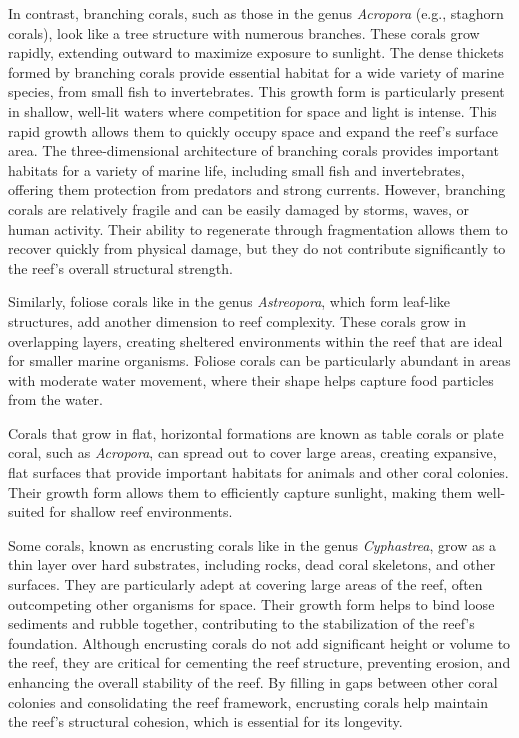 In contrast, branching corals, such as those in the genus \textit{Acropora} (e.g., staghorn corals), look like a tree structure with numerous branches. These corals grow rapidly, extending outward to maximize exposure to sunlight. The dense thickets formed by branching corals provide essential habitat for a wide variety of marine species, from small fish to invertebrates. This growth form is particularly present in shallow, well-lit waters where competition for space and light is intense. This rapid growth allows them to quickly occupy space and expand the reef's surface area. The three-dimensional architecture of branching corals provides important habitats for a variety of marine life, including small fish and invertebrates, offering them protection from predators and strong currents. However, branching corals are relatively fragile and can be easily damaged by storms, waves, or human activity. Their ability to regenerate through fragmentation allows them to recover quickly from physical damage, but they do not contribute significantly to the reef's overall structural strength.

Similarly, foliose corals like in the genus \textit{Astreopora}, which form leaf-like structures, add another dimension to reef complexity. These corals grow in overlapping layers, creating sheltered environments within the reef that are ideal for smaller marine organisms. Foliose corals can be particularly abundant in areas with moderate water movement, where their shape helps capture food particles from the water.

Corals that grow in flat, horizontal formations are known as table corals or plate coral, such as \textit{Acropora}, can spread out to cover large areas, creating expansive, flat surfaces that provide important habitats for animals and other coral colonies. Their growth form allows them to efficiently capture sunlight, making them well-suited for shallow reef environments.

Some corals, known as encrusting corals like in the genus \textit{Cyphastrea}, grow as a thin layer over hard substrates, including rocks, dead coral skeletons, and other surfaces. They are particularly adept at covering large areas of the reef, often outcompeting other organisms for space. Their growth form helps to bind loose sediments and rubble together, contributing to the stabilization of the reef's foundation. Although encrusting corals do not add significant height or volume to the reef, they are critical for cementing the reef structure, preventing erosion, and enhancing the overall stability of the reef. By filling in gaps between other coral colonies and consolidating the reef framework, encrusting corals help maintain the reef's structural cohesion, which is essential for its longevity.

